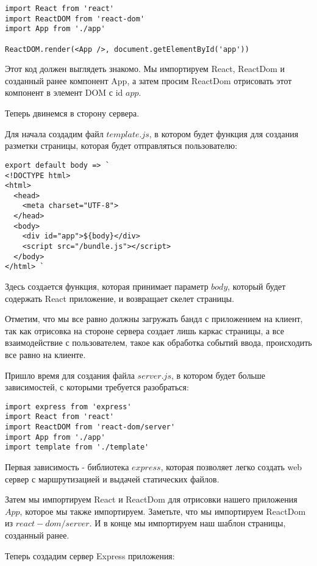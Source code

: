 \begin{lstlisting}
import React from 'react'
import ReactDOM from 'react-dom'
import App from './app'

ReactDOM.render(<App />, document.getElementById('app'))
\end{lstlisting}

Этот код должен выглядеть знакомо. Мы импортируем React, ReactDom и созданный ранее компонент App, а затем просим ReactDom отрисовать этот компонент в элемент DOM с id $app$.

Теперь двинемся в сторону сервера.

Для начала создадим файл $template.js$, в котором будет функция для создания разметки страницы, которая будет отправляться пользователю:

\begin{lstlisting}
export default body => `
<!DOCTYPE html>
<html>
  <head>
    <meta charset="UTF-8">
  </head>
  <body>
    <div id="app">${body}</div>
    <script src="/bundle.js"></script>
  </body>
</html> `
\end{lstlisting}

Здесь создается функция, которая принимает параметр $body$, который будет содержать React приложение, и возвращает скелет страницы.

Отметим, что мы все равно должны загружать бандл с приложением на клиент, так как отрисовка на стороне сервера создает лишь каркас страницы, а все взаимодействие с пользователем, такое как обработка событий ввода, происходить все равно на клиенте.

Пришло время для создания файла $server.js$, в котором будет больше зависимостей, с которыми требуется разобраться:

\begin{lstlisting}
import express from 'express'
import React from 'react'
import ReactDOM from 'react-dom/server'
import App from './app'
import template from './template'
\end{lstlisting}

Первая зависимость - библиотека $express$, которая позволяет легко создать web сервер с маршрутизацией и выдачей статических файлов.

Затем мы импортируем React и ReactDom для отрисовки нашего приложения $App$, которое мы также импортируем. Заметьте, что мы импортируем ReactDom из $react-dom/server$. И в конце мы импортируем наш шаблон страницы, созданный ранее.

Теперь создадим сервер Express приложения:

